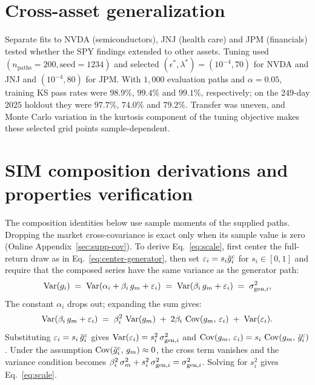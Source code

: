 \section{Cross-asset generalization}
\label{sec:supp-cross-asset}

Separate fits to NVDA (semiconductors), JNJ (health care) and JPM (financials) tested whether the SPY findings extended to other assets. Tuning used $(n_{\mathrm{paths}} = 200, \mathrm{seed} = 1234)$ and selected $(\epsilon^{*},\lambda^{*})=(10^{-4},70)$ for NVDA and JNJ and $(10^{-4},80)$ for JPM. With $1{,}000$ evaluation paths and $\alpha=0.05$, training KS pass rates were $98.9\%$, $99.4\%$ and $99.1\%$, respectively; on the $249$-day $2025$ holdout they were $97.7\%$, $74.0\%$ and $79.2\%$. Transfer was uneven, and Monte Carlo variation in the kurtosis component of the tuning objective makes these selected grid points sample-dependent.

\section{SIM composition derivations and properties verification}
\label{sec:supp-sim-derivations}

The composition identities below use sample moments of the supplied paths. Dropping the market cross-covariance is exact only when its sample value is zero (Online Appendix~\ref{sec:supp-cov}). To
derive Eq.~\eqref{eq:scale}, first center the full-return
draw as in Eq.~\eqref{eq:center-generator}, then set
$\varepsilon_i=s_i\tilde{g}_i^{\mathrm c}$ for $s_i\in[0,1]$ and require
that the composed series have the same variance as the generator
path:
\begin{equation}
  \operatorname{Var}(g_i) \;=\; \operatorname{Var}(\alpha_i + \beta_i\, g_m + \varepsilon_i)
            \;=\; \operatorname{Var}(\beta_i\, g_m + \varepsilon_i)
            \;=\; \sigma_{\mathrm{gen},i}^2,
\end{equation}
The constant $\alpha_i$ drops out; expanding the sum gives:
\begin{equation}
  \operatorname{Var}(\beta_i\, g_m + \varepsilon_i) \;=\; \beta_i^2\, \operatorname{Var}(g_m)
  \;+\; 2 \beta_i\, \operatorname{Cov}(g_m,\, \varepsilon_i)
  \;+\; \operatorname{Var}(\varepsilon_i).
\end{equation}
Substituting $\varepsilon_i = s_i\,\tilde{g}_i^{\mathrm c}$ gives
$\operatorname{Var}(\varepsilon_i) = s_i^2\,\sigma_{\mathrm{gen},i}^2$ and
$\operatorname{Cov}(g_m,\, \varepsilon_i) = s_i\,\operatorname{Cov}(g_m,\, \tilde{g}_i^{\mathrm c})$. Under the
assumption $\operatorname{Cov}(\tilde{g}_i^{\mathrm c},\,g_m)\approx0$, the cross term vanishes and
the variance condition becomes
$\beta_i^2\, \sigma_m^2 + s_i^2\, \sigma_{\mathrm{gen},i}^2 =
\sigma_{\mathrm{gen},i}^2$. Solving for $s_i^2$ gives Eq.~\eqref{eq:scale}.

